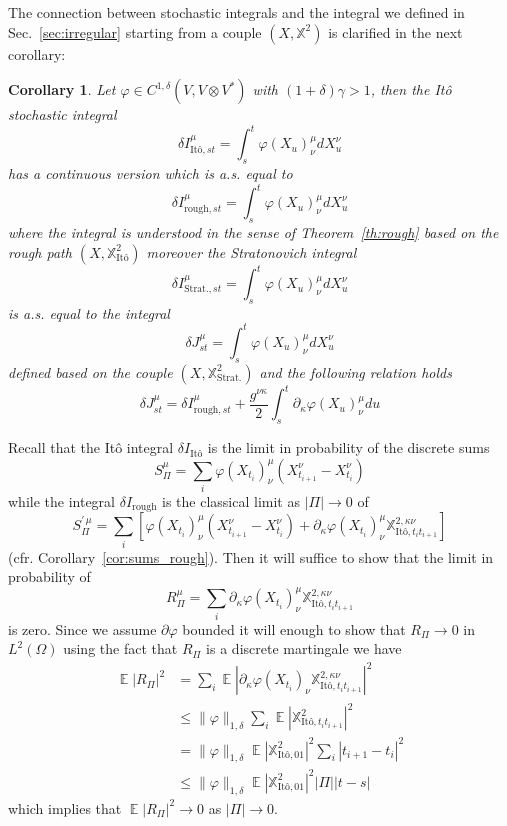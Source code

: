 \documentclass[a4paper,12pt,reqno]{amsproc}
\DeclareMathOperator{\expect}{{\mathbb E}}
\newcommand{\der}{\delta\!}
\newtheorem{corollary}{Corollary}
\begin{document}
The connection between  stochastic integrals and the integral
we defined in Sec.~\ref{sec:irregular} starting from a couple
$(X,\mathbb{X}^2)$ is clarified in the next corollary:

\begin{corollary}
Let $\varphi \in C^{1,\delta}(V,V\otimes V^*)$ with $(1+\delta)\gamma > 1$, then the It\^o stochastic integral
$$
\der I_{\text{It\^o},st}^\mu = \int_s^t \varphi(X_u)^\mu_\nu dX^\nu_u
$$
has a continuous version which is a.s. equal to
$$
\der I_{\text{rough},st}^\mu = \int_s^t \varphi(X_u)^\mu_\nu dX^\nu_u
$$
where the integral is understood in the sense of
Theorem~\ref{th:rough} based on the rough path
$(X,\mathbb{X}^2_{\text{It\^o}})$ moreover the Stratonovich integral
$$
\der I_{\text{Strat.},st}^\mu = \int_s^t \varphi(X_u)^\mu_\nu dX^\nu_u
$$
is a.s. equal to the integral
$$
\der J_{st}^\mu = \int_s^t \varphi(X_u)^\mu_\nu dX^\nu_u
$$
defined based on the couple $(X,\mathbb{X}^2_{\text{Strat.}})$ and
the following relation holds
$$
\der J_{st}^\mu = \der I_{\text{rough},st}^\mu + \frac{g^{\nu\kappa}}{2}  \int_s^t \partial_\kappa \varphi(X_u)^\mu_\nu du
$$   
\end{corollary}
\proof
Recall that the It\^o integral $\der I_{\text{It\^o}}$ is the
limit in probability of the discrete sums
$$
S^\mu_\Pi = \sum_i \varphi(X_{t_i})^\mu_\nu (X^\nu_{t_{i+1}}-X^\nu_{t_i})
$$
while the integral $\der I_{\text{rough}}$ is the classical limit
as $|\Pi| \to 0$ of
$$
S^{\prime\,\mu}_\Pi = \sum_i \left[\varphi(X_{t_i})^\mu_\nu (X^\nu_{t_{i+1}}-X^\nu_{t_i})
+ \partial_\kappa \varphi(X_{t_i})^\mu_\nu \mathbb{X}^{2,\kappa\nu}_{\text{It\^o},t_i t_{i+1}}\right]
$$
(cfr. Corollary~\ref{cor:sums_rough}). Then it will suffice to show
that the limit in probability of
$$
R^\mu_\Pi = \sum_i \partial_\kappa \varphi(X_{t_i})^\mu_\nu \mathbb{X}^{2,\kappa\nu}_{\text{It\^o},t_i t_{i+1}}
$$
is zero. Since we assume $\partial \varphi$ bounded it will enough to
show that $R_\Pi \to 0$ in $L^2(\Omega)$ using the fact that $R_\Pi$
is a discrete martingale we have
\begin{equation*}
  \begin{split}
\expect|R_\Pi|^2 & = \sum_i \expect |\partial_\kappa \varphi(X_{t_i})_\nu
\mathbb{X}^{2,\kappa\nu}_{\text{It\^o},t_i t_{i+1}}|^2      
\\& \le \|\varphi\|_{1,\delta} \sum_i \expect
|\mathbb{X}^{2}_{\text{It\^o},t_i t_{i+1}}|^2
\\& = \|\varphi\|_{1,\delta} \expect
|\mathbb{X}^{2}_{\text{It\^o},0 1}|^2 \sum_i |t_{i+1}-t_i|^2 
\\& \le \|\varphi\|_{1,\delta} \expect
|\mathbb{X}^{2}_{\text{It\^o},0 1}|^2 |\Pi| |t-s|
  \end{split}
\end{equation*}
which implies that $\expect|R_\Pi|^2 \to 0$ as $|\Pi| \to 0$.
\end{document}
